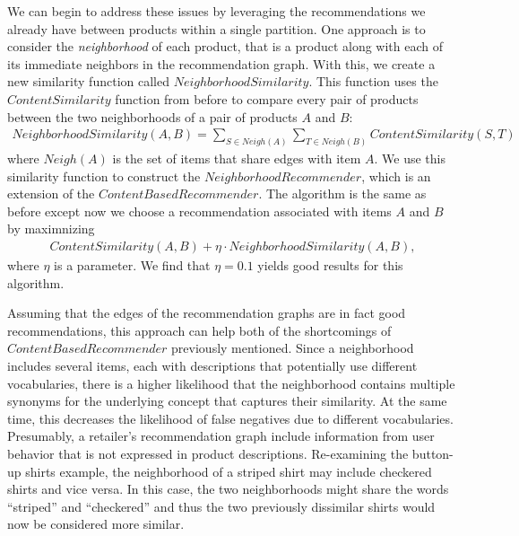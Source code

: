 \documentclass[11pt]{article}
\begin{document}
We can begin to address these issues by leveraging the recommendations we
already have between products within a single partition. One approach is to
consider the {\em neighborhood} of each product, that is a product along with
each of its immediate neighbors in the recommendation graph. With this, we
create a new similarity function called $NeighborhoodSimilarity$. This function
uses the $ContentSimilarity$ function from before to compare every pair of
products between the two neighborhoods of a pair of products $A$ and $B$:
\begin{align}
NeighborhoodSimilarity(A, B) = \sum\limits_{S\in
Neigh(A)}\sum\limits_{T\in Neigh(B)}
ContentSimilarity(S, T) 
\end{align}
where $Neigh(A)$ is the set of items that share edges with item $A$. We use this
similarity function to construct the $NeighborhoodRecommender$, which is
an extension of the $ContentBasedRecommender$. The algorithm is the same as
before except now we choose a recommendation associated with items $A$ and $B$
by maximnizing
\begin{align}
ContentSimilarity(A,B) + \eta \cdot NeighborhoodSimilarity(A, B),
\end{align}
where $\eta$ is a parameter. We find that $\eta = 0.1$ yields good results for
this algorithm.

Assuming that the edges of the recommendation graphs are in fact good
recommendations, this approach can help both of the shortcomings of
$ContentBasedRecommender$ previously mentioned. Since a neighborhood includes
several items, each with descriptions that potentially use different
vocabularies, there is a higher likelihood that the neighborhood contains
multiple synonyms for the underlying concept that captures their similarity. At
the same time, this decreases the likelihood of false negatives due to different
vocabularies. Presumably, a retailer's recommendation graph include information
from user behavior that is not expressed in product descriptions. Re-examining
the button-up shirts example, the neighborhood of a striped shirt may include
checkered shirts and vice versa.  In this case, the two neighborhoods might
share the words ``striped'' and ``checkered'' and thus the two previously
dissimilar shirts would now be considered more similar.
\end{document}

